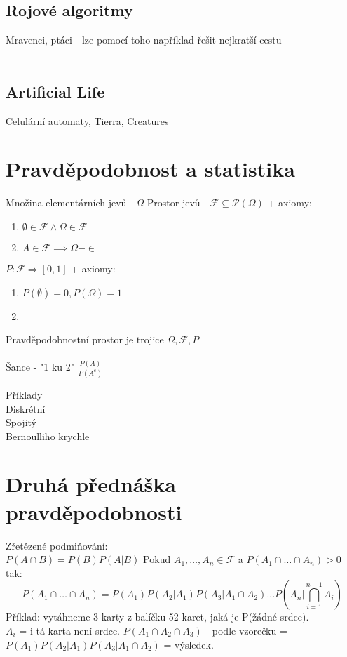 \documentclass{article}
\begin{document}
\subsection{Rojové algoritmy} 
Mravenci, ptáci - lze pomocí toho například řešit nejkratší cestu\\\\

\subsection{Artificial Life}
Celulární automaty, Tierra, Creatures






\section{Pravděpodobnost a statistika}
Množina elementárních jevů - $\Omega$
Prostor jevů - $\mathcal{F} \subseteq \mathcal{P}(\Omega) $ + axiomy:\\
\begin{enumerate}
    \item $\emptyset \in \mathcal{F} \wedge \Omega \in \mathcal{F}$
    \item $A \in \mathcal{F} \implies \Omega - \in $
\end{enumerate}
$P : \mathcal{F} \Rightarrow [0,1]$ + axiomy:\\
\begin{enumerate}
    \item $P(\emptyset) = 0, P(\Omega) = 1$
    \item 
\end{enumerate}
Pravděpodobnostní prostor je trojice $\Omega , \mathcal{F} , P$\\\\

Šance - "1 ku 2" $\frac{P(A)}{P(A^{c})}$

Příklady\\
Diskrétní\\
Spojitý\\
Bernoulliho krychle\\

\section{Druhá přednáška pravděpodobnosti}

Zřetězené podmiňování:\\
$P(A \cap B) = P(B)P(A|B)$
Pokud $A_{1},\dots,A_{n} \in \mathcal{F}$ a $P(A_{1}\cap \dots \cap A_{n})>0$ tak:
$$P(A_{1}\cap \dots \cap A_{n}) = P(A_{1})P(A_{2}|A_{1})P(A_{3}|A_{1}\cap A_{2})...P(A_{n}|\bigcap_{i=1}^{n-1}A_{i})$$
Příklad: vytáhneme 3 karty z balíčku 52 karet, jaká je P(žádné srdce).\\
$A_{i}$ = i-tá karta není srdce. $P(A_{1} \cap A_{2} \cap A_{3})$ - podle vzorečku = $P(A_{1})P(A_{2}|A_{1})P(A_{3}|A_{1}\cap A_{2})$ = výsledek.\\\\
\end{document}

